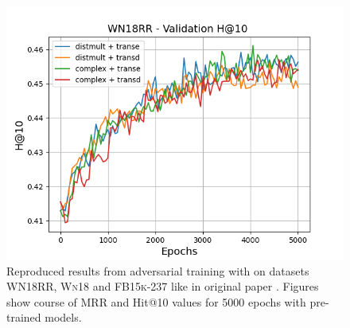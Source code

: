 \begin{figure}
\begin{minipage}{.3\textwidth}
      \includegraphics[width=\linewidth]{figures/results/gan_train/pretrained/random/wn18rr/gan_train_random_wn18rr_hit10s.png}
    \end{minipage}%
    \caption{Reproduced results from adversarial training with \origsampling on datasets \textsc{WN18RR}, \textsc{Wn18} and \textsc{FB15k-237} like in original \kbgan paper \cite{cai2017kbgan}.
    Figures show course of MRR and Hit@10 values for 5000 epochs with pre-trained models.}
    \label{fig:test}
\end{figure}